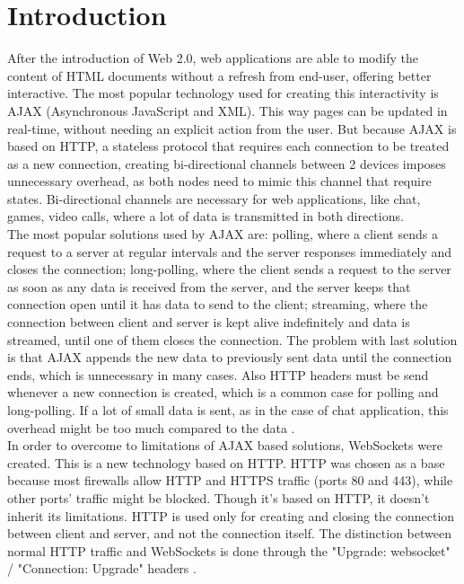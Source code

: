 \documentclass[conference]{IEEEtran}
\begin{document}
\section{Introduction}
After the introduction of Web 2.0, web applications are able to modify the
content of HTML documents without a refresh from end-user, offering better
interactive. The most popular technology used for creating this interactivity
is AJAX \cite{AJAX} (Asynchronous JavaScript and XML). This way pages can
be updated in real-time, without needing an explicit action from the user.
But because AJAX is based on HTTP, a stateless protocol that requires each
connection to be treated as a new connection, creating bi-directional channels
between 2 devices imposes unnecessary overhead, as both nodes need to mimic
this channel that require states. Bi-directional channels are necessary for
web applications, like chat, games, video calls, where a lot of data is
transmitted in both directions.
\\
\indent
The most popular solutions used by AJAX are: polling, where a client sends
a request to a server at regular intervals and the server responses immediately
and closes the connection; long-polling, where the client sends a request to the
server as soon as any data is received from the server, and the server keeps that
connection open until it has data to send to the client; streaming, where the
connection between client and server is kept alive indefinitely and data is streamed,
until one of them closes the connection. The problem with last solution is that AJAX
appends the new data to previously sent data until the connection ends, which is
unnecessary in many cases. Also HTTP headers must be send whenever a new connection is
created, which is a common case for polling and long-polling. If a lot of small data
is sent, as in the case of chat application, this overhead might be too much compared
to the data \cite{2009:Misc}.
\\
\indent
In order to overcome to limitations of AJAX based solutions, WebSockets \cite{RFC}
were created. This is a new technology based on HTTP. HTTP was chosen as a base
because most firewalls allow HTTP and HTTPS traffic  (ports 80 and 443), while
other ports' traffic might be blocked. Though it's based on HTTP, it doesn't
inherit its limitations. HTTP is used only for creating and closing the connection
between client and server, and not the connection itself. The distinction between
normal HTTP traffic and WebSockets is done through the "Upgrade: websocket" /
"Connection: Upgrade" headers \cite{RFC}.
\end{document}
